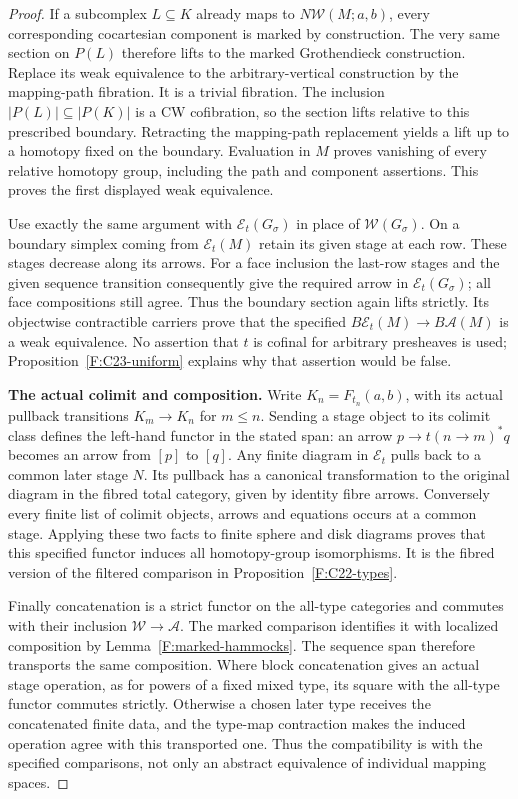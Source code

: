 \begin{proof}
If a subcomplex $L\subseteq K$ already maps to
$N\mathcal W(M;a,b)$, every corresponding cocartesian component is
marked by construction. The very same section on $P(L)$ therefore
lifts to the marked Grothendieck construction. Replace its weak
equivalence to the arbitrary-vertical construction by the mapping-path
fibration. It is a trivial fibration. The inclusion
$|P(L)|\subseteq|P(K)|$ is a CW cofibration, so the section lifts
relative to this prescribed boundary. Retracting the mapping-path
replacement yields a lift up to a homotopy fixed on the boundary.
Evaluation in $M$ proves vanishing of every relative homotopy group,
including the path and component assertions. This proves the first
displayed weak equivalence.

Use exactly the same argument with $\mathcal E_t(G_\sigma)$ in
place of $\mathcal W(G_\sigma)$. On a boundary simplex coming from
$\mathcal E_t(M)$ retain its given stage at each row. These stages
decrease along its arrows. For a face inclusion the last-row stages
and the given sequence transition consequently give the required
arrow in $\mathcal E_t(G_\sigma)$; all face compositions still agree.
Thus the boundary section again lifts strictly. Its objectwise
contractible carriers prove that the specified
$B\mathcal E_t(M)\to B\mathcal A(M)$ is a weak equivalence.
No assertion that $t$ is cofinal for arbitrary presheaves is used;
Proposition~\ref{F:C23-uniform} explains why that assertion would
be false.

\textbf{The actual colimit and composition.}
Write $K_n=F_{t_n}(a,b)$, with its actual pullback transitions
$K_m\to K_n$ for $m\leq n$. Sending a stage object to its colimit
class defines the left-hand functor in the stated span: an arrow
$p\to t(n\to m)^*q$ becomes an arrow from $[p]$ to $[q]$.
Any finite diagram in $\mathcal E_t$ pulls back to a common later
stage $N$. Its pullback has a canonical transformation to the original
diagram in the fibred total category, given by identity fibre arrows.
Conversely every finite list of colimit objects, arrows and equations
occurs at a common stage. Applying these two facts to finite sphere
and disk diagrams proves that this specified functor induces all
homotopy-group isomorphisms. It is the fibred version of the filtered
comparison in Proposition~\ref{F:C22-types}.

Finally concatenation is a strict functor on the all-type categories
and commutes with their inclusion $\mathcal W\to\mathcal A$.
The marked comparison identifies it with localized composition by
Lemma~\ref{F:marked-hammocks}. The sequence span therefore transports
the same composition. Where block concatenation gives an actual
stage operation, as for powers of a fixed mixed type, its square with
the all-type functor commutes strictly. Otherwise a chosen later
type receives the concatenated finite data, and the type-map
contraction makes the induced operation agree with this transported
one. Thus the compatibility is with the specified comparisons, not
only an abstract equivalence of individual mapping spaces.
\end{proof}
